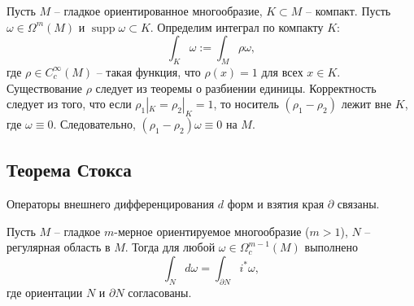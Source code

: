 
\begin{definition}
    Пусть $M$ -- гладкое ориентированное многообразие, $K \subset M$ -- компакт.
    Пусть $\omega \in \Omega^m(M)$ и $\operatorname{supp} \omega \subset K$.
    Определим интеграл по компакту $K$:
    \[ \int_K \omega := \int_M \rho \omega, \]
    где $\rho \in C_c^\infty(M)$ -- такая функция, что $\rho(x) = 1$ для всех $x \in K$.
    Существование $\rho$ следует из теоремы о разбиении единицы.
    Корректность следует из того, что если $\rho_1|_K = \rho_2|_K = 1$, то носитель $(\rho_1 - \rho_2)$ лежит вне $K$, где $\omega \equiv 0$. Следовательно, $(\rho_1 - \rho_2)\omega \equiv 0$ на $M$.
\end{definition}

\subsection{Теорема Стокса}

Операторы внешнего дифференцирования $d$ форм и взятия края $\partial$ связаны.

\begin{theorem}
    Пусть $M$ -- гладкое $m$-мерное ориентируемое многообразие ($m > 1$), $N$ -- регулярная область в $M$. Тогда для любой $\omega \in \Omega_c^{m-1}(M)$ выполнено
    \[
    \int_N d\omega = \int_{\partial N} i^*\omega,
    \]
    где ориентации $N$ и $\partial N$ согласованы.
\end{theorem}


